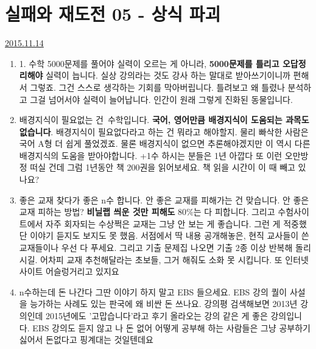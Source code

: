 \section{실패와 재도전 05 - 상식 파괴}
\href{https://www.kockoc.com/Apoc/484851}{2015.11.14}

\vspace{5mm}

\begin{enumerate}
    \item 1. 수학 5000문제를 풀어야 실력이 오르는 게 아니라, \textbf{5000문제를 틀리고 오답정리해야} 실력이 늡니다.
    실상 강의라는 것도 강사 하는 말대로 받아쓰기이니까 편해서 그렇죠. 그건 스스로 생각하는 기회를 막아버립니다.
    틀려보고 왜 틀렸나 분석하고 그걸 넘어서야 실력이 늘어납니다. 인간이 원래 그렇게 진화된 동물입니다.
    \vspace{5mm}

    \item 배경지식이 필요없는 건 수학입니다.
    \textbf{국어, 영어만큼 배경지식이 도움되는 과목도 없습니다}. 배경지식이 필요없다라고 하는 건 뭐라고 해야할지.
    물리 빠삭한 사람은 국어 A형 더 쉽게 풀었겠죠. 물론 배경지식이 없으면 추론해야겠지만 이 역시 다른 배경지식의 도움을 받아야합니다.
    +1수 하시는 분들은 1년 아깝다 또 이런 오만방정 떠실 건데 그럼 1년동안 책 200권을 읽어보세요. 책 읽을 시간이 이 때 빼고 있나요?
    \vspace{5mm}

    \item 좋은 교재 찾다가 좋은 n수 합니다.
    안 좋은 교재를 피해가는 건 맞습니다. 안 좋은 교재 피하는 방법? \textbf{비닐랩 씌운 것만 피해도} 80$\%$는 다 피합니다.
    그리고 수험사이트에서 자주 회자되는 수상쩍은 교재는 그냥 안 보는 게 좋습니다. 그런 게 적중했단 이야기 듣지도 보지도 못 했음.
    서점에서 딱 내용 공개해놓은, 현직 교사들이 쓴 교재들이나 우선 다 푸세요. 그리고 기출 문제집 나오면 기출 2종 이상 반복해 돌리시길.
    어차피 교재 추천해달라는 초보들, 그거 해줘도 소화 못 시킵니다. 또 인터넷 사이트 어슬렁거리고 있지요
    \vspace{5mm}

    \item n수하는데 돈 나간다 그딴 이야기 하지 말고 EBS 들으세요. EBS 강의 퀄이 사설을 능가하는 사례도 있는 판국에 왜 비싼 돈 쓰나요.
    강의평 검색해보면 2013년 강의인데 2015년에도 '고맙습니다'라고 후기 올라오는 강의 같은 게 좋은 강의입니다.
    EBS 강의도 듣지 않고 나 돈 없어 어떻게 공부해 하는 사람들은 그냥 공부하기 싫어서 돈없다고 핑계대는 것일텐데요
    \vspace{5mm}
    

\end{enumerate}
